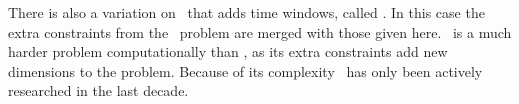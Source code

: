 There is also a variation on \PDP\ that adds time windows, called \PDPTW. In this case the extra constraints from the \VRPTW\ problem are merged with those given here. \PDP\ is a much harder problem computationally than \CVRP, as its extra constraints add new dimensions to the problem. Because of its complexity \PDP\ has only been actively researched in the last decade. 


